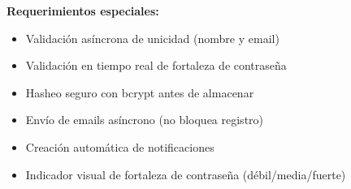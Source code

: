 \vspace{0.5em}
\noindent\textbf{Requerimientos especiales:}
\begin{itemize}[nosep]
    \item Validación asíncrona de unicidad (nombre y email)
    \item Validación en tiempo real de fortaleza de contraseña
    \item Hasheo seguro con bcrypt antes de almacenar
    \item Envío de emails asíncrono (no bloquea registro)
    \item Creación automática de notificaciones
    \item Indicador visual de fortaleza de contraseña (débil/media/fuerte)
\end{itemize}
